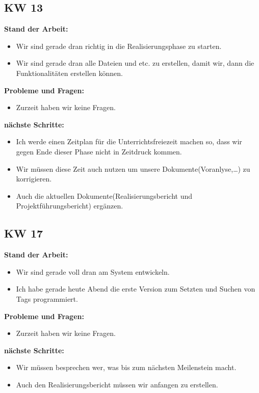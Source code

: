 \documentclass[10pt,paper=a4,final]{scrartcl}
\begin{document}
\subsection{KW 13}
\begin{description}
  \item {\bf Stand der Arbeit: } \\
    \begin{itemize}
      \item Wir sind gerade dran richtig in die Realisierungsphase zu starten.
      \item Wir sind gerade dran alle Dateien und etc. zu erstellen, damit wir, dann die Funktionalitäten erstellen können.
    \end{itemize}
  \item {\bf Probleme und Fragen: } \\
    \begin{itemize}
      \item Zurzeit haben wir keine Fragen.
    \end{itemize}
  \item {\bf nächste Schritte: } \\
    \begin{itemize}
      \item Ich werde einen Zeitplan für die Unterrichtsfreiezeit machen so, dass wir gegen Ende dieser Phase nicht in Zeitdruck kommen.
      \item Wir müssen diese Zeit auch nutzen um unsere Dokumente(Voranlyse,\ldots) zu korrigieren.
      \item Auch die aktuellen Dokumente(Realisierungsbericht und Projektführungsbericht) ergänzen.
    \end{itemize}
\end{description}
\subsection{KW 17}
\begin{description}
  \item {\bf Stand der Arbeit: } \\
    \begin{itemize}
      \item Wir sind gerade voll dran am System entwickeln.
      \item Ich habe gerade heute Abend die erste Version zum Setzten und Suchen von Tags programmiert.
    \end{itemize}
  \item {\bf Probleme und Fragen: } \\
    \begin{itemize}
      \item Zurzeit haben wir keine Fragen.
    \end{itemize}
  \item {\bf nächste Schritte: } \\
    \begin{itemize}
      \item Wir müssen besprechen wer, was bis zum nächsten Meilenstein macht.
      \item Auch den Realisierungsbericht müssen wir anfangen zu erstellen.
    \end{itemize}
\end{description}
\end{document}
